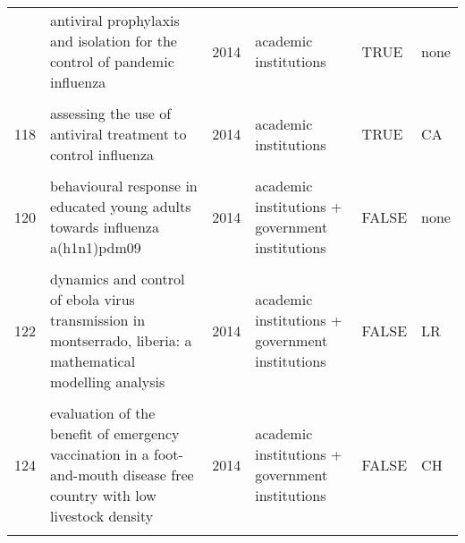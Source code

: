 \documentclass[
]{article}
\begin{document}
\begin{landscape}
\begin{longtable}{l>{\raggedright\arraybackslash}p{4cm}l>{\raggedright\arraybackslash}p{3.5cm}l>{\raggedright\arraybackslash}p{1.5cm}}
\addlinespace
116 & antiviral prophylaxis and isolation for the control of pandemic influenza & 2014 & academic institutions & TRUE & none\\
\cellcolor{gray!6}{117} & \cellcolor{gray!6}{assessing the impact of travel restrictions on international spread of the 2014 west african ebola epidemic} & \cellcolor{gray!6}{2014} & \cellcolor{gray!6}{academic institutions + government institutions} & \cellcolor{gray!6}{FALSE} & \cellcolor{gray!6}{global}\\
118 & assessing the use of antiviral treatment to control influenza & 2014 & academic institutions & TRUE & CA\\
\cellcolor{gray!6}{119} & \cellcolor{gray!6}{behavior in the time of cholera: evidence from the 2008-2009 cholera outbreak in zimbabwe} & \cellcolor{gray!6}{2014} & \cellcolor{gray!6}{academic institutions} & \cellcolor{gray!6}{TRUE} & \cellcolor{gray!6}{ZW}\\
120 & behavioural response in educated young adults towards influenza a(h1n1)pdm09 & 2014 & academic institutions + government institutions & FALSE & none\\
\addlinespace
\cellcolor{gray!6}{121} & \cellcolor{gray!6}{cover your cough! quantifying the benefits of a localized healthy behavior intervention on flu epidemics in washington dc} & \cellcolor{gray!6}{2014} & \cellcolor{gray!6}{academic institutions} & \cellcolor{gray!6}{TRUE} & \cellcolor{gray!6}{US}\\
122 & dynamics and control of ebola virus transmission in montserrado, liberia: a mathematical modelling analysis & 2014 & academic institutions + government institutions & FALSE & LR\\
\cellcolor{gray!6}{123} & \cellcolor{gray!6}{estimating the effectiveness of early control measures through school absenteeism surveillance in observed outbreaks at rural schools in hubei, china} & \cellcolor{gray!6}{2014} & \cellcolor{gray!6}{academic institutions + government institutions + NGO} & \cellcolor{gray!6}{FALSE} & \cellcolor{gray!6}{CN}\\
124 & evaluation of the benefit of emergency vaccination in a foot-and-mouth disease free country with low livestock density & 2014 & academic institutions + government institutions & FALSE & CH\\
\cellcolor{gray!6}{125} & \cellcolor{gray!6}{modeling the dynamics of oral poliovirus vaccine cessation} & \cellcolor{gray!6}{2014} & \cellcolor{gray!6}{academic institutions + NGO} & \cellcolor{gray!6}{FALSE} & \cellcolor{gray!6}{none}\\

\end{longtable}
\end{landscape}
\end{document}
